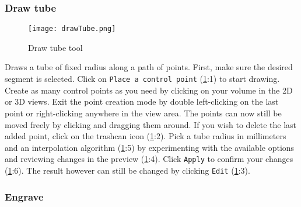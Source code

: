 \subsubsection{Draw tube}\label{section:dt}
\begin{figure}[h]
	\begin{subfigure}{0.2\textwidth}
		
	\end{subfigure}
	\begin{subfigure}{0.2\textwidth}
		
	\end{subfigure}
	\begin{subfigure}{0.2\textwidth}
		
	\end{subfigure}

\end{figure}

\begin{figure}[h!]
	\centerline{
		\texttt{[image: drawTube.png]}}
	\caption{Draw tube tool}\label{fig:tube}
\end{figure}
\noindent
Draws a tube of fixed radius along a path of points.
First, make sure the desired segment is selected.
Click on \texttt{Place a control point} (\cref{fig:tube}:1) to start drawing.
Create as many control points as you need by clicking on your volume in the 2D or 3D views.
Exit the point creation mode by double left-clicking on the last point or right-clicking anywhere in the view area.
The points can now still be moved freely by clicking and dragging them around.
If you wish to delete the last added point, click on the trashcan icon (\cref{fig:tube}:2).
Pick a tube radius in millimeters and an interpolation algorithm (\cref{fig:tube}:5) by experimenting with the available options and reviewing changes in the preview (\cref{fig:tube}:4).
Click \texttt{Apply} to confirm your changes (\cref{fig:tube}:6).
The result however can still be changed by clicking \texttt{Edit} (\cref{fig:tube}:3).

\pagebreak
\subsubsection{Engrave}
\begin{figure}[h]
	\begin{subfigure}{0.2\textwidth}
		
	\end{subfigure}
	\begin{subfigure}{0.2\textwidth}
		
	\end{subfigure}
	\begin{subfigure}{0.2\textwidth}
		
	\end{subfigure}
\end{figure}

